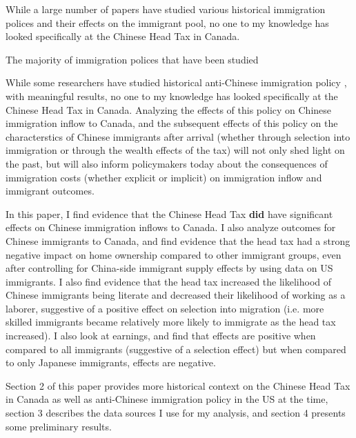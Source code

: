 \documentclass[12pt]{article}
\begin{document}
While a large number of papers have studied various historical immigration polices and their effects on the immigrant pool, no one to my knowledge has looked specifically at the Chinese Head Tax in Canada. 

The majority of immigration polices that have been studied 




While some researchers have studied historical anti-Chinese immigration policy \citep{Chen2015, ChenXie2020, Postel2023}, with meaningful results, no one to my knowledge has looked specifically at the Chinese Head Tax in Canada. Analyzing the effects of this policy on Chinese immigration inflow to Canada, and the subsequent effects of this policy on the characterstics of Chinese immigrants after arrival (whether through selection into immigration or through the wealth effects of the tax) will not only shed light on the past, but will also inform policymakers today about the consequences of immigration costs (whether explicit or implicit) on immigration inflow and immigrant outcomes.

In this paper, I find evidence that the Chinese Head Tax \textbf{did} have significant effects on Chinese immigration inflows to Canada. I also analyze outcomes for Chinese immigrants to Canada, and find evidence that the head tax had a strong negative impact on home ownership compared to other immigrant groups, even after controlling for China-side immigrant supply effects by using data on US immigrants. 
I also find evidence that the head tax increased the likelihood of Chinese immigrants being literate and decreased their likelihood of working as a laborer, suggestive of a positive effect on selection into migration (i.e. more skilled immigrants became relatively more likely to immigrate as the head tax increased). I also look at earnings, and find that effects are positive when compared to all immigrants (suggestive of a selection effect) but when compared to only Japanese immigrants, effects are negative.

Section 2 of this paper provides more historical context on the Chinese Head Tax in Canada as well as anti-Chinese immigration policy in the US at the time, section 3 describes the data sources I use for my analysis, and section 4 presents some preliminary results.
\end{document}
